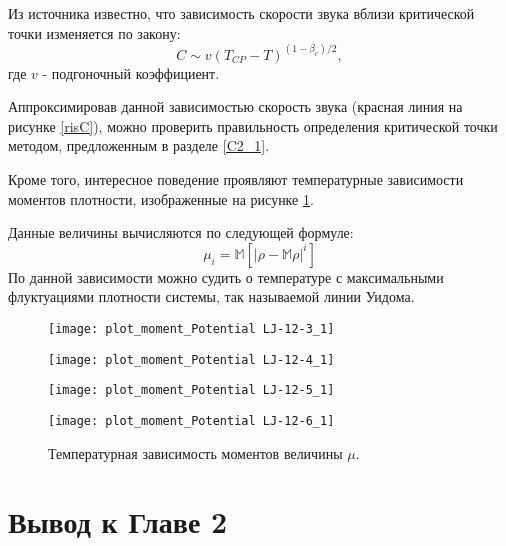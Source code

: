 Из источника \cite{soundSpeed} известно, что зависимость скорости звука вблизи критической точки изменяется по закону:
\begin{equation}
    C \sim v(T_{CP} - T)^{(1-\beta_c)/2},
    \label{eqFitC}
\end{equation}
где $v$ - подгоночный коэффициент.

Аппроксимировав данной зависимостью скорость звука (красная линия на рисунке \ref{risC}), можно проверить правильность определения критической точки методом, предложенным в разделе \ref{C2_1}.

Кроме того, интересное поведение проявляют температурные зависимости моментов плотности, изображенные на рисунке \ref{risMu}.

Данные величины вычисляются по следующей формуле:
\begin{equation}
\mu_i = \mathbb{M} \left[ |\rho - \mathbb{M} \rho|^i \right]
\end{equation}
По данной зависимости можно судить о температуре с максимальными флуктуациями плотности системы, так называемой линии Уидома.

\begin{figure}[h]
\begin{center}
\begin{minipage}[h]{0.45\linewidth}
\texttt{[image: plot\_moment\_Potential LJ-12-3\_1]}
\end{minipage}
\begin{minipage}[h]{0.45\linewidth}
\texttt{[image: plot\_moment\_Potential LJ-12-4\_1]}
\end{minipage}


\begin{minipage}[h]{0.45\linewidth}
\texttt{[image: plot\_moment\_Potential LJ-12-5\_1]}
\end{minipage}
\begin{minipage}[h]{0.45\linewidth}
\texttt{[image: plot\_moment\_Potential LJ-12-6\_1]}
\end{minipage}
\caption{Температурная зависимость моментов величины $\mu$.}
\label{risMu}
\end{center}
\end{figure}



\section{Вывод к Главе 2}\label{C2_4}

